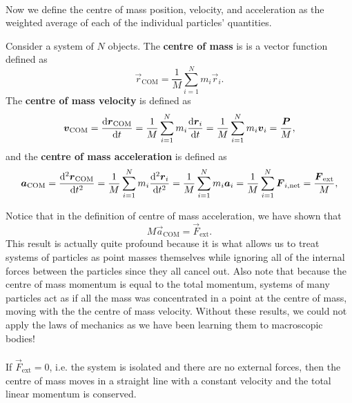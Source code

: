 \documentclass[../classical_mechanics.tex]{subfiles}
\begin{document}
        \paragraph{}
        Now we define the centre of mass position, velocity, and acceleration as the weighted average of each of the individual particles' quantities.
        \begin{definition}
            Consider a system of $N$ objects.
            The \textbf{centre of mass} is is a vector function defined as
            \begin{equation}
                \vec{r}_\text{COM}=\frac{1}{M}\sum_{i=1}^N m_i\vec{r}_i.
            \end{equation}
            The \textbf{centre of mass velocity} is defined as
            \begin{equation}
                \vec{v}_\text{COM}=\dv{\vec{r}_\text{COM}}{t}=\frac{1}{M}\sum_{i=1}^N m_i\dv{\vec{r}_i}{t}=\frac{1}{M}\sum_{i=1}^N m_i\vec{v}_i=\frac{\vec{P}}{M},
            \end{equation}
            and the \textbf{centre of mass acceleration} is defined as
            \begin{equation}
                \vec{a}_\text{COM}=\dv[2]{\vec{r}_\text{COM}}{t}=\frac{1}{M}\sum_{i=1}^N m_i\dv[2]{\vec{r}_i}{t}=\frac{1}{M}\sum_{i=1}^N m_i\vec{a}_i=\frac{1}{M}\sum_{i=1}^N\vec{F}_{i,\text{net}}=\frac{\vec{F}_\text{ext}}{M},
            \end{equation}
        \end{definition}
        Notice that in the definition of centre of mass acceleration, we have shown that
        \begin{equation}\label{eq-NII-macroscopic}
            M\vec{a}_\text{COM}=\vec{F}_\text{ext}.
        \end{equation}
        This result is actually quite profound because it is what allows us to treat systems of particles as point masses themselves while ignoring all of the internal forces between the particles since they all cancel out.
        Also note that because the centre of mass momentum is equal to the total momentum, systems of many particles act as if all the mass was concentrated in a point at the centre of mass, moving with the the centre of mass velocity.
        Without these results, we could not apply the laws of mechanics as we have been learning them to macroscopic bodies!

        \paragraph{}
        If $\vec{F}_\text{ext}=0$, i.e. the system is isolated and there are no external forces, then the centre of mass moves in a straight line with a constant velocity and the total linear momentum is conserved.
\end{document}
